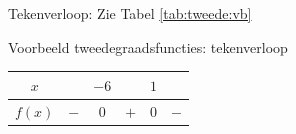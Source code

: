 \begin{voorbeeld}
Tekenverloop:
Zie Tabel \ref{tab:tweede:vb}

\begin{tabel}{Voorbeeld tweedegraadsfuncties: tekenverloop}
\begin{tabular}{c||c|c|c|c|c}
	$x$ &  & $-6$ &  & $1$ & \\
	\hline 
	$f(x)$ & $-$ & 0 & $+$ & 0 & $-$\\
\end{tabular}
\label{tab:tweede:vb}	
\end{tabel}

\end{voorbeeld}
